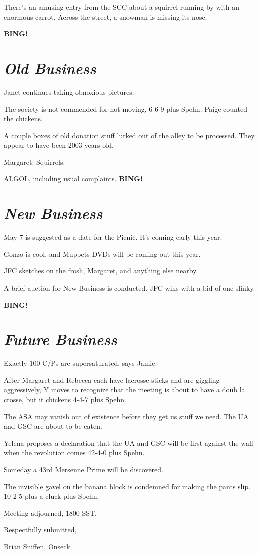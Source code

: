 \documentclass[10pt]{article}
\newcommand{\bing}{{\bf BING!} }
\newcommand{\goto}[1]{\bing \vskip 12pt \section*{{\em{#1}}}}
\newcommand{\ps}{ plus Spehn\xspace}
\begin{document}
There's an amusing entry from the SCC about a squirrel running by with
an enormous carrot.  Across the street, a snowman is missing its nose.

\goto{Old Business}
Janet continues taking obnoxious pictures.

The society is not commended for not moving, 6-6-9\ps.  Paige counted the chickens.

A couple boxes of old donation stuff lurked out of the alley to be
processed.  They appear to have been 2003 years old.

Margaret: Squirrels.

ALGOL, including usual complaints.
\goto{New Business}

May 7 is suggested as a date for the Picnic.  It's coming early this
year.

Gonzo is cool, and Muppets DVDs will be coming out this year.

JFC sketches on the frosh, Margaret, and anything else nearby.

A brief auction for New Business is conducted.  JFC wins with a bid of
one slinky.

\goto{Future Business}

Exactly 100 C/Ps are supersaturated, says Jamie.

After Margaret and Rebecca each have lacrosse sticks and are giggling
aggressively, Y moves to recognize that the meeting is about to have a
doub la crosse, but it chickens 4-4-7\ps.

The ASA may vanish out of existence before they get us stuff we need.
The UA and GSC are about to be eaten.

Yelena proposes a declaration that the UA and GSC will be first
against the wall when the revolution comes 42-4-0\ps.

Someday a 43rd Mersenne Prime will be discovered.

The invisible gavel on the banana block is condemned for making the
pants slip.  10-2-5 plus a cluck \ps.

\vspace{12pt}

\noindent
Meeting adjourned, 1800 SST.

\vspace{18pt}

\centerline{Respectfully submitted,}
\centerline{Brian Sniffen, Onseck}
\end{document}
